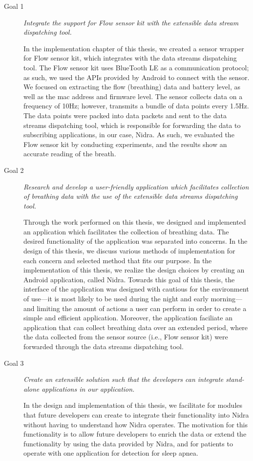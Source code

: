 \begin{description}
    \item[Goal 1] \textit{Integrate the support for Flow sensor kit with the extensible data stream dispatching tool.}

    In the implementation chapter of this thesis, we created a sensor wrapper for Flow sensor kit, which integrates with the data streams dispatching tool. The Flow sensor kit uses BlueTooth LE as a communication protocol; as such, we used the APIs provided by Android to connect with the sensor. We focused on extracting the flow (breathing) data and battery level, as well as the mac address and firmware level. The sensor collects data on a frequency of 10Hz; however, transmits a bundle of data points every 1.5Hz. The data points were packed into data packets and sent to the data streams dispatching tool, which is responsible for forwarding the data to subscribing applications, in our case, Nidra. As such, we evaluated the Flow sensor kit by conducting experiments, and the results show an accurate reading of the breath. 

    \item[Goal 2] \textit{Research and develop a user-friendly application which facilitates collection of breathing data with the use of the extensible data streams dispatching tool.}


    Through the work performed on this thesis, we designed and implemented an application which facilitates the collection of breathing data. The desired functionality of the application was separated into concerns. In the design of this thesis, we discuss various methods of implementation for each concern and selected method that fits our purpose.  In the implementation of this thesis, we realize the design choices by creating an Android application, called Nidra. Towards this goal of this thesis, the interface of the application was designed with cautious for the environment of use---it is most likely to be used during the night and early morning---and limiting the amount of actions a user can perform in order to create a simple and efficient application. Moreover, the application faciliate an application that can collect breathing data over an extended period, where the data collected from the sensor source (i.e., Flow sensor kit) were forwarded through the data streams dispatching tool. 


    \item[Goal 3] \textit{Create an extensible solution such that the developers can integrate stand-alone applications in our application.}

    In the design and implementation of this thesis, we facilitate for modules that future developers can create to integrate their functionality into Nidra without having to understand how Nidra operates. The motivation for this functionality is to allow future developers to enrich the data or extend the functionality by using the data provided by Nidra, and for patients to operate with one application for detection for sleep apnea. 
\end{description}


